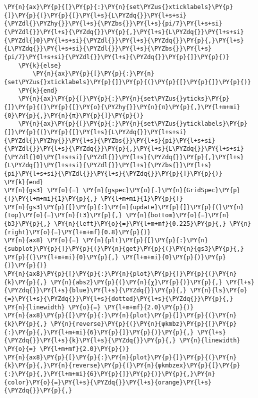 \begin{Verbatim}[commandchars=\\\{\}]
        \PY{n}{ax}\PY{p}{[}\PY{p}{:}\PY{n}{set\PYZus{}xticklabels}\PY{p}{]}\PY{p}{(}\PY{p}{[}\PY{l+s}{L\PYZdq{}}\PY{l+s+si}{\PYZdl{}\PYZhy{}}\PY{l+s}{\PYZbs{}}\PY{l+s}{pi/7}\PY{l+s+si}{\PYZdl{}}\PY{l+s}{\PYZdq{}}\PY{p}{,}\PY{l+s}{L\PYZdq{}}\PY{l+s+si}{\PYZdl{}0}\PY{l+s+si}{\PYZdl{}}\PY{l+s}{\PYZdq{}}\PY{p}{,}\PY{l+s}{L\PYZdq{}}\PY{l+s+si}{\PYZdl{}}\PY{l+s}{\PYZbs{}}\PY{l+s}{pi/7}\PY{l+s+si}{\PYZdl{}}\PY{l+s}{\PYZdq{}}\PY{p}{]}\PY{p}{)}
    \PY{k}{else}
        \PY{n}{ax}\PY{p}{[}\PY{p}{:}\PY{n}{set\PYZus{}xticklabels}\PY{p}{]}\PY{p}{(}\PY{p}{[}\PY{p}{]}\PY{p}{)}
    \PY{k}{end}
    \PY{n}{ax}\PY{p}{[}\PY{p}{:}\PY{n}{set\PYZus{}yticks}\PY{p}{]}\PY{p}{(}\PY{p}{[}\PY{o}{\PYZhy{}}\PY{n}{π}\PY{p}{,}\PY{l+m+mi}{0}\PY{p}{,}\PY{n}{π}\PY{p}{]}\PY{p}{)}
    \PY{n}{ax}\PY{p}{[}\PY{p}{:}\PY{n}{set\PYZus{}yticklabels}\PY{p}{]}\PY{p}{(}\PY{p}{[}\PY{l+s}{L\PYZdq{}}\PY{l+s+si}{\PYZdl{}\PYZhy{}}\PY{l+s}{\PYZbs{}}\PY{l+s}{pi}\PY{l+s+si}{\PYZdl{}}\PY{l+s}{\PYZdq{}}\PY{p}{,}\PY{l+s}{L\PYZdq{}}\PY{l+s+si}{\PYZdl{}0}\PY{l+s+si}{\PYZdl{}}\PY{l+s}{\PYZdq{}}\PY{p}{,}\PY{l+s}{L\PYZdq{}}\PY{l+s+si}{\PYZdl{}}\PY{l+s}{\PYZbs{}}\PY{l+s}{pi}\PY{l+s+si}{\PYZdl{}}\PY{l+s}{\PYZdq{}}\PY{p}{]}\PY{p}{)}
\PY{k}{end}
\PY{n}{gs3} \PY{o}{=} \PY{n}{gspec}\PY{o}{.}\PY{n}{GridSpec}\PY{p}{(}\PY{l+m+mi}{1}\PY{p}{,} \PY{l+m+mi}{1}\PY{p}{)}
\PY{n}{gs3}\PY{p}{[}\PY{p}{:}\PY{n}{update}\PY{p}{]}\PY{p}{(}\PY{n}{top}\PY{o}{=}\PY{n}{t3}\PY{p}{,} \PY{n}{bottom}\PY{o}{=}\PY{n}{b3}\PY{p}{,} \PY{n}{left}\PY{o}{=}\PY{l+m+mf}{0.225}\PY{p}{,} \PY{n}{right}\PY{o}{=}\PY{l+m+mf}{0.8}\PY{p}{)}
\PY{n}{ax8} \PY{o}{=} \PY{n}{plt}\PY{p}{[}\PY{p}{:}\PY{n}{subplot}\PY{p}{]}\PY{p}{(}\PY{n}{get}\PY{p}{(}\PY{n}{gs3}\PY{p}{,} \PY{p}{(}\PY{l+m+mi}{0}\PY{p}{,} \PY{l+m+mi}{0}\PY{p}{)}\PY{p}{)}\PY{p}{)}
\PY{n}{ax8}\PY{p}{[}\PY{p}{:}\PY{n}{plot}\PY{p}{]}\PY{p}{(}\PY{n}{k}\PY{p}{,} \PY{n}{abs2}\PY{p}{(}\PY{n}{χ}\PY{p}{)}\PY{p}{,} \PY{l+s}{\PYZdq{}}\PY{l+s}{blue}\PY{l+s}{\PYZdq{}}\PY{p}{,} \PY{n}{ls}\PY{o}{=}\PY{l+s}{\PYZdq{}}\PY{l+s}{dotted}\PY{l+s}{\PYZdq{}}\PY{p}{,} \PY{n}{linewidth} \PY{o}{=} \PY{l+m+mf}{2.0}\PY{p}{)}
\PY{n}{ax8}\PY{p}{[}\PY{p}{:}\PY{n}{plot}\PY{p}{]}\PY{p}{(}\PY{n}{k}\PY{p}{,} \PY{n}{reverse}\PY{p}{(}\PY{n}{ψkmbz}\PY{p}{[}\PY{p}{:}\PY{p}{,}\PY{l+m+mi}{6}\PY{p}{]}\PY{p}{)}\PY{p}{,} \PY{l+s}{\PYZdq{}}\PY{l+s}{k}\PY{l+s}{\PYZdq{}}\PY{p}{,} \PY{n}{linewidth} \PY{o}{=} \PY{l+m+mf}{2.0}\PY{p}{)}
\PY{n}{ax8}\PY{p}{[}\PY{p}{:}\PY{n}{plot}\PY{p}{]}\PY{p}{(}\PY{n}{k}\PY{p}{,}\PY{n}{reverse}\PY{p}{(}\PY{n}{ψkmbzex}\PY{p}{[}\PY{p}{:}\PY{p}{,}\PY{l+m+mi}{6}\PY{p}{]}\PY{p}{)}\PY{p}{,}\PY{n}{color}\PY{o}{=}\PY{l+s}{\PYZdq{}}\PY{l+s}{orange}\PY{l+s}{\PYZdq{}}\PY{p}{,}

\end{Verbatim}
